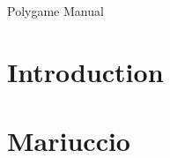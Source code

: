\documentclass[11pt]{article}
\begin{document}
Polygame Manual
\clearpage

\tableofcontents
\clearpage

\section{Introduction}

\section{Mariuccio}
\end{document}

